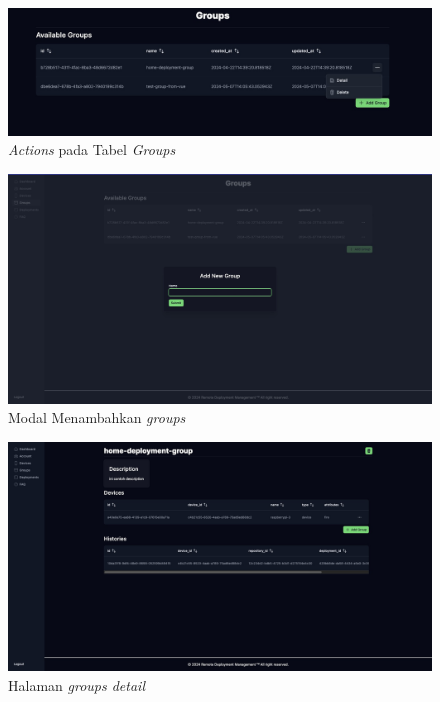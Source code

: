 \begin{figure}[h]
  \centering
  \includegraphics[width=1\textwidth]{resources/chapter-4/dashboard/groups-page-actions.jpg}
  \caption{\textit{Actions} pada Tabel \textit{Groups}}
  \label{fig:halaman-groups-actions}
\end{figure}

\begin{figure}[h]
  \centering
  \includegraphics[width=1\textwidth]{resources/chapter-4/dashboard/groups-page-add.jpg}
  \caption{Modal Menambahkan \textit{groups}}
  \label{fig:halaman-groups-add}
\end{figure}

\begin{figure}[h]
  \centering
  \includegraphics[width=1\textwidth]{resources/chapter-4/dashboard/groups-detail-page.jpg}
  \caption{Halaman \textit{groups detail}}
  \label{fig:halaman-groups-detail}
\end{figure}

